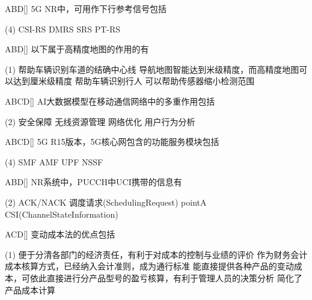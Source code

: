 \begin{choice}{\;ABD\;}[]
    5G NR中，可用作下行参考信号包括
    \begin{tasks}(4)
        \task CSI-RS
        \task DMRS
        \task SRS
        \task PT-RS
    \end{tasks}
\end{choice}

\begin{choice}{\;ABD\;}[]
    以下属于高精度地图的作用的有
    \begin{tasks}(1)
        \task 帮助车辆识别车道的结确中心线
        \task 导航地图智能达到米级精度，而高精度地图可以达到厘米级精度
        \task 帮助车辆识别行人
        \task 可以帮助传感器缩小检测范围
    \end{tasks}
\end{choice}

\begin{choice}{\;ABCD\;}[]
    AI大数据模型在移动通信网络中的多重作用包括
    \begin{tasks}(2)
        \task 安全保障
        \task 无线资源管理
        \task 网络优化
        \task 用户行为分析
    \end{tasks}
\end{choice}


\begin{choice}{\;ABCD\;}[]
    5G R15版本，5G核心网包含的功能服务模块包括
    \begin{tasks}(4)
        \task SMF
        \task AMF
        \task UPF
        \task NSSF
    \end{tasks}
\end{choice}


\begin{choice}{\;ABD\;}[]
    NR系统中，PUCCH中UCI携带的信息有
    \begin{tasks}(2)
        \task ACK/NACK
        \task 调度请求(SchedulingRequest)
        \task pointA
        \task CSI(ChannelStateInformation)
    \end{tasks}
\end{choice}

\begin{choice}{\;ACD\;}[]
    变动成本法的优点包括
    \begin{tasks}(1)
        \task 便于分清各部门的经济责任，有利于对成本的控制与业绩的评价
        \task 作为财务会计成本核算方式，已经纳入会计准则，成为通行标准
        \task 能直接提供各种产品的变动成本，可依此直接进行分产品型号的盈亏核算，有利于管理人员的决策分析
        \task 简化了产品成本计算
    \end{tasks}
\end{choice}


